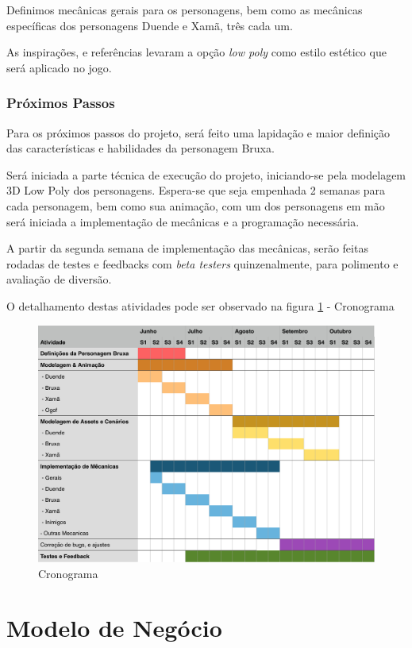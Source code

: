 Definimos mecânicas gerais para os personagens, bem como as mecânicas específicas dos personagens Duende e Xamã, três cada um.

As inspirações, e referências levaram a opção \textit{low poly} como estilo estético que será aplicado no jogo. 


\subsection{Próximos Passos}

Para os próximos passos do projeto, será feito uma lapidação e maior definição das características e habilidades da personagem Bruxa.

Será iniciada a parte técnica de execução do projeto, iniciando-se pela modelagem 3D Low Poly dos personagens. Espera-se que seja empenhada 2 semanas para cada personagem, bem como sua animação, com um dos personagens em mão será iniciada a implementação de mecânicas e a programação necessária.

A partir da segunda semana de implementação das mecânicas, serão feitas rodadas de testes e feedbacks com \textit{beta testers} quinzenalmente, para polimento e avaliação de diversão.

O detalhamento destas atividades pode ser observado na figura \ref{fig_crono} - Cronograma

\begin{figure}[!htb] \caption{\label{fig_crono}Cronograma} \begin{center}
\includegraphics[width=\textwidth]{imagens/crono.png} \end{center}
 \end{figure}

\chapter{Modelo de Negócio}


